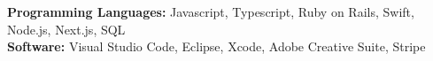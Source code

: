 \noindent
\textbf{Programming Languages:} Javascript, Typescript, Ruby on Rails, Swift, Node.js, Next.js, SQL \\
\textbf{Software:} Visual Studio Code, Eclipse, Xcode, Adobe Creative Suite, Stripe
